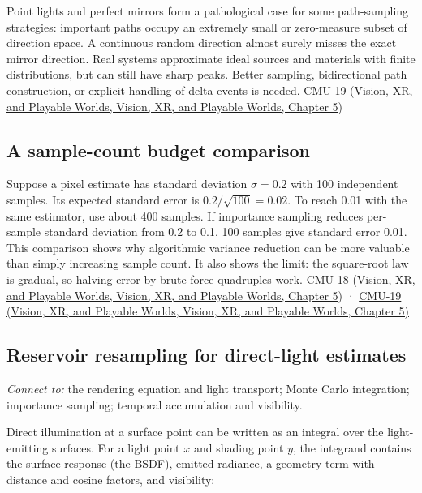 Point lights and perfect mirrors form a pathological case for some path-sampling strategies: important paths occupy an extremely small or zero-measure subset of direction space. A continuous random direction almost surely misses the exact mirror direction. Real systems approximate ideal sources and materials with finite distributions, but can still have sharp peaks. Better sampling, bidirectional path construction, or explicit handling of delta events is needed. \href{../07-Vision-XR-and-Playable-Worlds/main.pdf\#nameddest=04-visual-computing-ii-ch036-cmu-19---variance-reduction}{CMU-19 (Vision, XR, and Playable Worlds, Vision, XR, and Playable Worlds, Chapter 5)}

\subsection{A sample-count budget comparison}\label{03-visual-computing-i-ch012-a-sample-count-budget-comparison}

Suppose a pixel estimate has standard deviation \(\sigma=0.2\) with 100 independent samples. Its expected standard error is \(0.2/\sqrt{100}=0.02\). To reach 0.01 with the same estimator, use about 400 samples. If importance sampling reduces per-sample standard deviation from 0.2 to 0.1, 100 samples give standard error 0.01. This comparison shows why algorithmic variance reduction can be more valuable than simply increasing sample count. It also shows the limit: the square-root law is gradual, so halving error by brute force quadruples work. \href{../07-Vision-XR-and-Playable-Worlds/main.pdf\#nameddest=04-visual-computing-ii-ch036-cmu-18---monte-carlo-rendering}{CMU-18 (Vision, XR, and Playable Worlds, Vision, XR, and Playable Worlds, Chapter 5)} · \href{../07-Vision-XR-and-Playable-Worlds/main.pdf\#nameddest=04-visual-computing-ii-ch036-cmu-19---variance-reduction}{CMU-19 (Vision, XR, and Playable Worlds, Vision, XR, and Playable Worlds, Chapter 5)}

\subsection{Reservoir resampling for direct-light estimates}\label{03-visual-computing-i-ch012-reservoir-resampling-for-direct-light-estimates}

\emph{Connect to:} the rendering equation and light transport; Monte Carlo integration; importance sampling; temporal accumulation and visibility.

Direct illumination at a surface point can be written as an integral over the light-emitting surfaces. For a light point \(x\) and shading point \(y\), the integrand contains the surface response (the BSDF), emitted radiance, a geometry term with distance and cosine factors, and visibility:

